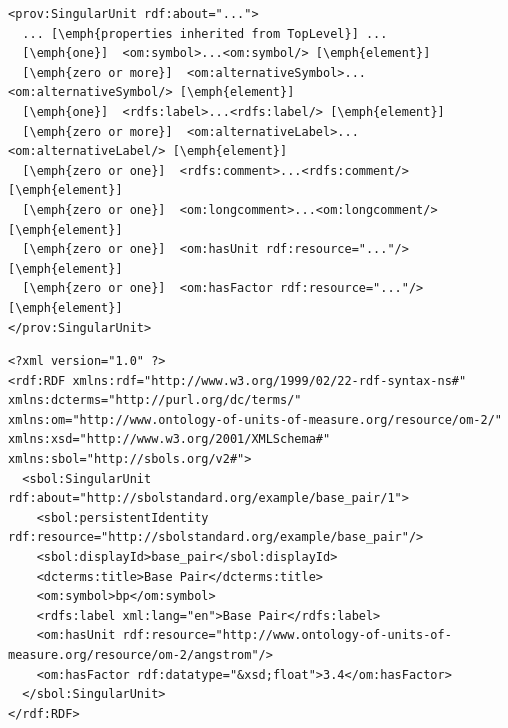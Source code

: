 \begin{lstlisting}
<prov:SingularUnit rdf:about="...">
  ... [\emph{properties inherited from TopLevel}] ...
  [\emph{one}]  <om:symbol>...<om:symbol/> [\emph{element}]
  [\emph{zero or more}]  <om:alternativeSymbol>...<om:alternativeSymbol/> [\emph{element}]
  [\emph{one}]  <rdfs:label>...<rdfs:label/> [\emph{element}]
  [\emph{zero or more}]  <om:alternativeLabel>...<om:alternativeLabel/> [\emph{element}]
  [\emph{zero or one}]  <rdfs:comment>...<rdfs:comment/> [\emph{element}]
  [\emph{zero or one}]  <om:longcomment>...<om:longcomment/> [\emph{element}]
  [\emph{zero or one}]  <om:hasUnit rdf:resource="..."/> [\emph{element}]
  [\emph{zero or one}]  <om:hasFactor rdf:resource="..."/> [\emph{element}]
</prov:SingularUnit>
\end{lstlisting}

\begin{lstlisting}
<?xml version="1.0" ?>
<rdf:RDF xmlns:rdf="http://www.w3.org/1999/02/22-rdf-syntax-ns#" xmlns:dcterms="http://purl.org/dc/terms/" xmlns:om="http://www.ontology-of-units-of-measure.org/resource/om-2/" xmlns:xsd="http://www.w3.org/2001/XMLSchema#" xmlns:sbol="http://sbols.org/v2#">
  <sbol:SingularUnit rdf:about="http://sbolstandard.org/example/base_pair/1">
    <sbol:persistentIdentity rdf:resource="http://sbolstandard.org/example/base_pair"/>
    <sbol:displayId>base_pair</sbol:displayId>
    <dcterms:title>Base Pair</dcterms:title>
    <om:symbol>bp</om:symbol>
    <rdfs:label xml:lang="en">Base Pair</rdfs:label>
    <om:hasUnit rdf:resource="http://www.ontology-of-units-of-measure.org/resource/om-2/angstrom"/>
    <om:hasFactor rdf:datatype="&xsd;float">3.4</om:hasFactor>
  </sbol:SingularUnit>
</rdf:RDF>
\end{lstlisting}
\label{ser:Measure}




